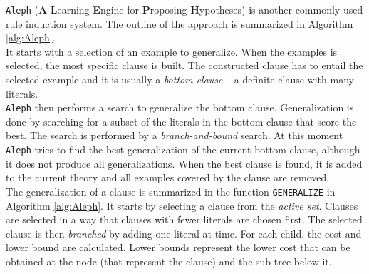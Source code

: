 \texttt{Aleph} (\textbf{A} \textbf{L}earning \textbf{E}ngine for \textbf{P}roposing \textbf{H}ypotheses) is another commonly used rule induction system. The outline of the approach is summarized in Algorithm \ref{alg:Aleph}.  \\

It starts with a selection of an example to generalize. When the examples is selected, the most specific clause is built. The constructed clause has to entail the selected example and it is usually a \textit{bottom clause} -- a definite clause with many literals. \\

\texttt{Aleph} then performs a search to generalize the bottom clause. Generalization is done by searching for a subset of the literals in the bottom clause that score the best. The search is performed by a \textit{branch-and-bound} search. At this moment \texttt{Aleph} tries to find the best generalization of the current bottom clause, although it does not produce all generalizations. When the best clause is found, it is added to the current theory and all examples covered by the clause are removed. \\

The generalization of a clause is summarized in the function \texttt{GENERALIZE} in Algorithm \ref{alg:Aleph}. It starts by selecting a clause from the \textit{active set}. Clauses are selected in a way that clauses with fewer literals are chosen first. The selected clause is then \textit{branched} by adding one literal at time. For each child, the cost and lower bound are calculated. Lower bounds represent the lower cost that can be obtained at the node (that represent the clause) and the sub-tree below it. 

